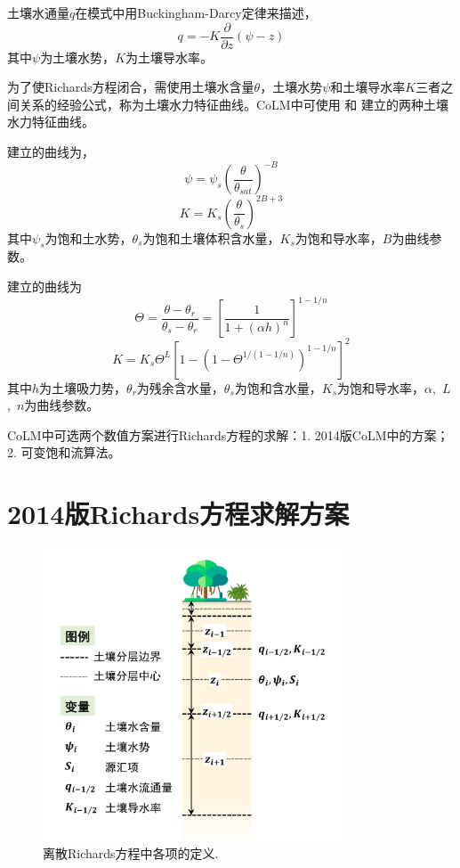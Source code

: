 土壤水通量$q$在模式中用Buckingham-Darcy定律来描述，
\begin{equation}
q=-K \frac{\partial}{\partial z}(\psi-z)
\end{equation}
其中$\psi$为土壤水势，$K$为土壤导水率。

为了使Richards方程闭合，需使用土壤水含量$\theta$，土壤水势$\psi$和土壤导水率$K$三者之间关系的经验公式，称为土壤水力特征曲线。CoLM中可使用\citet{campbell1974} 和 \citet{van1980closed} 建立的两种土壤水力特征曲线。

\citet{campbell1974}建立的曲线为，
\begin{equation}\label{eq:SW_CB}
\psi=\psi_{s}\left(\frac{\theta}{\theta_{sat}}\right)^{-B}
\end{equation}
\begin{equation}\label{eq:Ks_CB}
K=K_{s}\left(\frac{\theta}{\theta_{s}}\right)^{2 B+3}
\end{equation}
其中$\psi_s$为饱和土水势，$\theta_{s}$为饱和土壤体积含水量，$K_{s}$为饱和导水率，$B$为曲线参数。

\citet{van1980closed} 建立的曲线为
\begin{equation}\label{eq:SW_VG}
    \Theta = \frac{\theta-\theta_r}{\theta_s-\theta_r} = \left[\frac{1}{1+\left(\alpha h\right)^n}\right]^{1-1/n}
\end{equation}
\begin{equation}\label{eq:Ks_VG}
    K = K_s \Theta^L \left[1-\left(1-\Theta^{1/\left(1-1/n\right)}\right)^{1-1/n}\right]^2
\end{equation}
其中$h$为土壤吸力势，$\theta_r$为残余含水量，$\theta_s$为饱和含水量，$K_{s}$为饱和导水率，$\alpha$,~$L$,~$n$为曲线参数。

CoLM中可选两个数值方案进行Richards方程的求解：1. 2014版CoLM中的方案；2. 可变饱和流算法。

\section{2014版Richards方程求解方案}

{
\begin{figure}[htbp]
\centering
\includegraphics[width=0.8\textwidth]{Figures/植被冠层和土壤水分/土壤水离散.jpg}
\caption{离散Richards方程中各项的定义.}
\label{fig:土壤水离散}
\end{figure}
}

